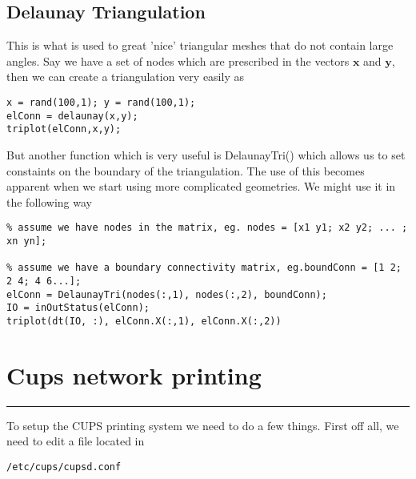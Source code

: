 \documentclass[a4paper, 10pt]{article}
\newcommand{\mytoprule}{\hrule\vspace{4mm}}
\begin{document}
\subsection*{Delaunay Triangulation}
This is what is used to great 'nice' triangular meshes that do not contain large angles. Say we have a set of nodes which are prescribed in the vectors $\mathbf{x}$ and $\mathbf{y}$, then we can create a triangulation very easily as
\begin{verbatim}
x = rand(100,1); y = rand(100,1);
elConn = delaunay(x,y);
triplot(elConn,x,y);
\end{verbatim}

But another function which is very useful is DelaunayTri() which allows us to set constaints on the boundary of the triangulation. The use of this becomes apparent when we start using more complicated geometries. We might use it in the following way
\begin{verbatim}
% assume we have nodes in the matrix, eg. nodes = [x1 y1; x2 y2; ... ; xn yn];

% assume we have a boundary connectivity matrix, eg.boundConn = [1 2; 2 4; 4 6...];
elConn = DelaunayTri(nodes(:,1), nodes(:,2), boundConn);
IO = inOutStatus(elConn);
triplot(dt(IO, :), elConn.X(:,1), elConn.X(:,2))
\end{verbatim}

\vspace{10mm}
\section*{Cups network printing}
\mytoprule

To setup the CUPS printing system we need to do a few things. First off all, we need to edit a file located in 
\begin{verbatim}
/etc/cups/cupsd.conf
\end{verbatim}
\end{document}
